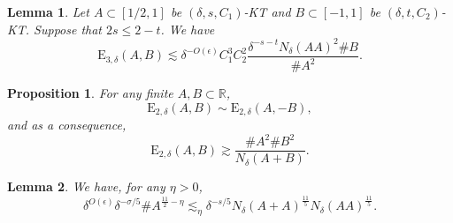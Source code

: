 \documentclass[10pt,a4paper]{amsart}
\newtheorem{lemma}{Lemma}
\newtheorem{proposition}{Proposition}
\begin{document}
\begin{lemma}\label{lem.energybounds}
  Let \(A \subset [1 / 2 , 1]\) be \((\delta,s,C_1)\)-KT and \(B \subset [-1,1]\) be \((\delta,t,C_2)\)-KT. Suppose that \(2s \leq 2 - t\). We have
\[
    \mathrm{E} _{3,\delta} (A,B) \lesssim  \delta^{- O(\epsilon)} C_1^{3}  C_2 ^{2}\frac{ \delta^{-s - t} N_{\delta} (AA)^{2} \# B}{\# A ^{2}} 
.\]
\end{lemma}

\begin{proposition}\label{prop:e2-cauchy-schwarz}
For any finite \(A,B \subset \mathbb{R} \),
\[
	\mathrm{E} _{2,\delta} (A,B) \sim  \mathrm{E} _{2,\delta} (A,-B)
,\]
and as a consequence,
\[
	\mathrm{E} _{2,\delta} (A,B) \gtrsim \frac{\# A ^{2} \# B ^{2}}{N_{\delta} \left( A + B \right) } 
.\]
\end{proposition}

\begin{lemma}\label{lem.sumlowerbounds}
We have, for any \(\eta > 0\), 
\[
    \delta^{O(\epsilon)} \delta^{- \sigma / 5    } \# A ^{\frac{11}{2} - \eta }\lesssim_{\eta}  \delta^{- s /5} N_{\delta} (A+A) ^{\frac{11}{5} } N_{\delta} (AA)^{\frac{11}{5} }
.\]
\end{lemma}
\end{document}
